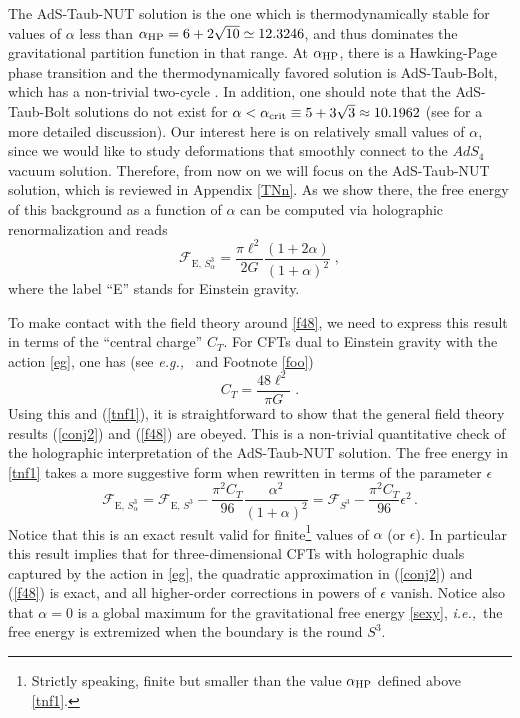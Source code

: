 \documentclass[12pt]{article}
\numberwithin{equation}{section}
\newcommand{\req}[1]{(\ref{#1})} %
\newcommand{\ssc}{\scriptscriptstyle}
\newcommand{\eg}{{\it e.g.,}\ }
\newcommand{\ie}{{\it i.e.,}\ }
\newcommand{\ctt}{C_{\ssc T}}
\begin{document}
The AdS-Taub-NUT solution is the one which is thermodynamically stable for values of $\alpha$ less than $\alpha_{\rm HP} =6 + 2\sqrt{10}\simeq 12.3246$, and thus dominates the gravitational partition function in that range. At $\alpha_{\rm HP}$, there is a Hawking-Page phase transition and the thermodynamically favored solution is AdS-Taub-Bolt, which has a non-trivial two-cycle \cite{Emparan:1999pm,Mann:1999pc}. In addition, one should note that the AdS-Taub-Bolt solutions do not exist for $\alpha<\alpha_{\rm crit}\equiv 5+3\sqrt{3}\approx 10.1962$ (see \cite{Bobev:2016sap} for a more detailed discussion). Our interest here is on relatively small values of $\alpha$, since we would like to study deformations that smoothly connect to the $AdS_4$ vacuum solution. Therefore, from now on we will focus on the AdS-Taub-NUT solution, which is reviewed in Appendix \ref{TNn}. As we show there, the free energy of this background as a function of $\alpha$ can be computed via holographic renormalization and reads \cite{Emparan:1999pm}
%
\begin{equation}\label{tnf1}
\mathcal{F}_{\textrm{E},\,S^3_{\alpha}}=\frac{\pi \ell^2}{2G}\frac{(1+2\alpha)}{(1+\alpha)^2}\;,
\end{equation}
%
where the label ``E'' stands for Einstein gravity. 

To make contact with the field theory around \eqref{f48}, we need to express this result in terms of the ``central charge'' $\ctt$. For CFTs dual to Einstein gravity with the action \eqref{eg}, one has (see \eg \cite{Buchel:2009sk} and Footnote \ref{foo})
%
\begin{equation}
\ctt=\frac{48\ell^2}{\pi G}\;.
\end{equation}
%
Using this and \req{tnf1}, it is straightforward to show that the general field theory results \req{conj2} and \req{f48} are obeyed. This is a non-trivial quantitative check of the holographic interpretation of the AdS-Taub-NUT solution. The free energy in \eqref{tnf1} takes a more suggestive form when rewritten in terms of the parameter $\epsilon$
%
\begin{equation}\label{sexy}
\mathcal{F}_{\textrm{E},\,S^3_{\alpha}}=\mathcal{F}_{\textrm{E},\,S^3}-\frac{\pi^2\ctt}{96}\frac{\alpha^2}{(1+\alpha)^2}=\mathcal{F}_{S^{3}}-\frac{\pi^2\ctt}{96}\epsilon^2\, .
\end{equation}
%
Notice that this is an exact result valid for finite\footnote{Strictly speaking, finite but smaller than the value $\alpha_{\rm HP}$ defined above \eqref{tnf1}.} values of $\alpha$ (or $\epsilon$). In particular this result implies that for three-dimensional CFTs with holographic duals captured by the action in \eqref{eg}, the quadratic approximation in \req{conj2} and \req{f48} is exact, and all higher-order corrections in powers of $\epsilon$ vanish. Notice also that $\alpha=0$ is a global maximum for the gravitational free energy \eqref{sexy}, \ie the free energy is extremized when the boundary is the round $S^3$. 
\end{document}
